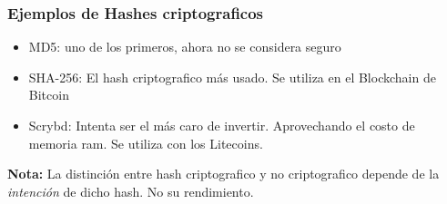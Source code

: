 \documentclass{beamer}
\begin{document}
\begin{frame}
    \frametitle{Ejemplos de Hashes criptograficos}
    \begin{itemize}
        \item{MD5: uno de los primeros, ahora no se considera seguro}
        \item{SHA-256: El hash criptografico m\'as usado. Se utiliza en
        el Blockchain de Bitcoin}
        \item{Scrybd: Intenta ser el m\'as caro de invertir. Aprovechando
        el costo de memoria ram. Se utiliza con los Litecoins.}
    \end{itemize}
{\bf Nota:} La distinci\'on entre hash criptografico y no criptografico
depende de la \emph{intenci\'on} de dicho hash. No su rendimiento.
\end{frame}
\end{document}
